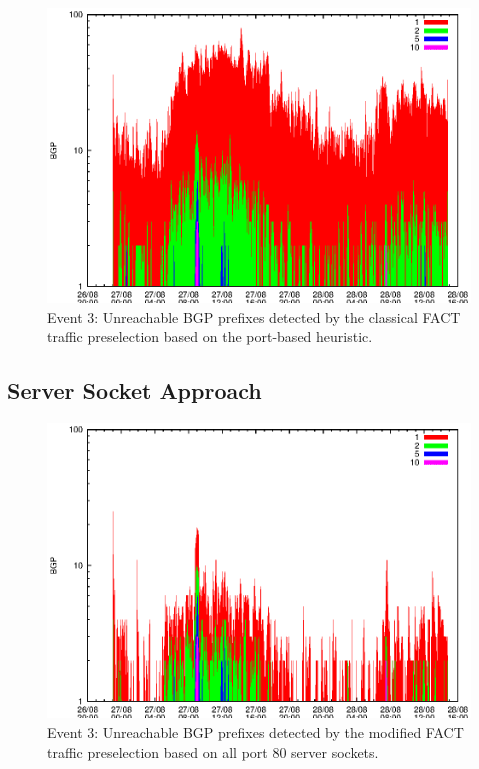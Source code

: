 \begin{figure}
	[p] \centering 
	\includegraphics[width=0.75\linewidth]{images/events/2010_08_27/bgp_log_port80_ref.eps}
	\caption{Event 3: Unreachable BGP prefixes detected by the classical FACT traffic preselection based on the port-based heuristic.} 
	\label{fig:RIPE_FACT_REF} 
\end{figure}

\subsection{Server Socket Approach}

\begin{figure}
	[p] \centering 
	\includegraphics[width=0.75\linewidth]{images/events/2010_08_27/bgp_log_allPort80SES.eps}
	\caption{Event 3: Unreachable BGP prefixes detected by the modified FACT traffic preselection based on all port 80 server sockets.} 
	\label{fig:RIPE_FACT_allSES80} 
\end{figure}



